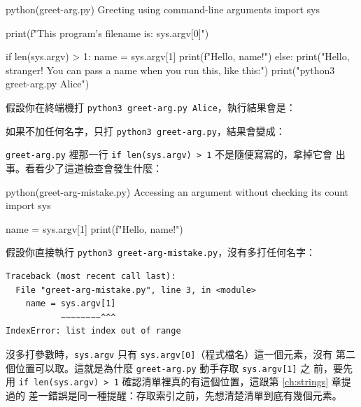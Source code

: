 
\begin{example}{python}{(greet-arg.py) Greeting using command-line arguments}
import sys

print(f"This program's filename is: {sys.argv[0]}")

if len(sys.argv) > 1:
    name = sys.argv[1]
    print(f"Hello, {name}!")
else:
    print("Hello, stranger! You can pass a name when you run this, like this:")
    print("python3 greet-arg.py Alice")
\end{example}

假設你在終端機打 \texttt{python3 greet-arg.py Alice}，執行結果會是：


如果不加任何名字，只打 \texttt{python3 greet-arg.py}，結果會變成：


\texttt{greet-arg.py} 裡那一行 \texttt{if len(sys.argv) > 1} 不是隨便寫寫的，拿掉它會
出事。看看少了這道檢查會發生什麼：

\begin{example}{python}{(greet-arg-mistake.py) Accessing an argument without checking its count}
import sys

name = sys.argv[1]
print(f"Hello, {name}!")
\end{example}

假設你直接執行 \texttt{python3 greet-arg-mistake.py}，沒有多打任何名字：

\begin{verbatim}
Traceback (most recent call last):
  File "greet-arg-mistake.py", line 3, in <module>
    name = sys.argv[1]
           ~~~~~~~~^^^
IndexError: list index out of range
\end{verbatim}

沒多打參數時，\texttt{sys.argv} 只有 \texttt{sys.argv[0]}（程式檔名）這一個元素，沒有
第二個位置可以取。這就是為什麼 \texttt{greet-arg.py} 動手存取 \texttt{sys.argv[1]} 之
前，要先用 \texttt{if len(sys.argv) > 1} 確認清單裡真的有這個位置，這跟第 \ref{ch:strings} 章提過的
差一錯誤是同一種提醒：存取索引之前，先想清楚清單到底有幾個元素。

